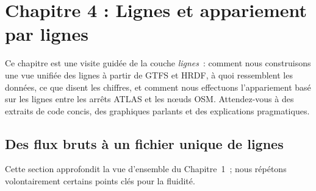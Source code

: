 \chapter{Chapitre 4 : Lignes et appariement par lignes}

\noindent Ce chapitre est une visite guidée de la couche \emph{lignes} : comment nous construisons une vue unifiée des lignes à partir de GTFS et HRDF, à quoi ressemblent les données, ce que disent les chiffres, et comment nous effectuons l'appariement basé sur les lignes entre les arrêts ATLAS et les nœuds OSM. Attendez-vous à des extraits de code concis, des graphiques parlants et des explications pragmatiques.

\section{Des flux bruts à un fichier unique de lignes}
\noindent Cette section approfondit la vue d'ensemble du Chapitre~1 ; nous répétons volontairement certains points clés pour la fluidité.
